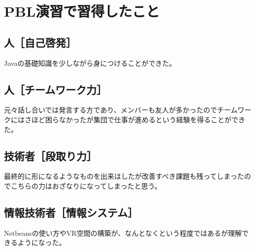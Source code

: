 \documentclass[a4j]{jarticle}
\begin{document}
\begin{center}
\begin{tabular}{|p{25mm}|p{125mm}|}

\end{tabular}
\end{center}

\section{PBL演習で習得したこと}
%

\subsection*{人［自己啓発］}
Javaの基礎知識を少しながら身につけることができた。

\subsection*{人［チームワーク力］}
元々話し合いでは発言する方であり、メンバーも友人が多かったのでチームワークにはさほど困らなかったが集団で仕事が進めるという経験を得ることができた。

\subsection*{技術者［段取り力］}
最終的に形になるようなものを出来はしたが改善すべき課題も残ってしまったのでこちらの力はおざなりになってしまったと思う。

\subsection*{情報技術者［情報システム］}
Netbeansの使い方やVR空間の構築が、なんとなくという程度ではあるが理解できるようになった。
\end{document}
